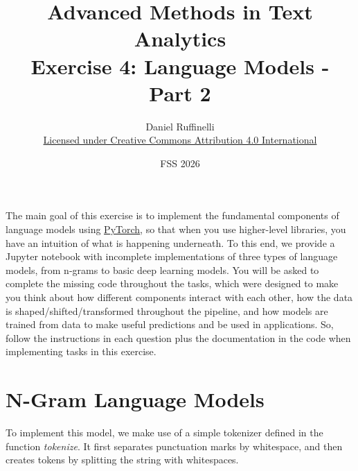\documentclass[11pt,a4paper]{article}
\title{Advanced Methods in Text Analytics \\ 
Exercise 4: Language Models - Part 2}
\author{Daniel Ruffinelli \\ \href{https://creativecommons.org/licenses/by/4.0/}{Licensed under Creative Commons Attribution 4.0 International}}
\date{FSS 2026}
\begin{document}
\maketitle

The main goal of this exercise is to implement the fundamental components of
language models using \href{https://pytorch.org/}{\underline{PyTorch}}, so that
when you use higher-level libraries, you have an intuition of what is happening
underneath.
To this end, we provide a Jupyter notebook with incomplete implementations of
three types of language models, from n-grams to basic deep learning models.
You will be asked to complete the missing code throughout the tasks, which were
designed to make you think about how different components interact with each
other, how the data is shaped/shifted/transformed throughout the pipeline, and
how models are trained from data to make useful predictions and be used in
applications.
So, follow the instructions in each question plus the documentation in the code
when implementing tasks in this exercise.

\section{N-Gram Language Models}

To implement this model, we make use of a simple tokenizer defined in the
function \emph{tokenize}.
It first separates punctuation marks by whitespace, and then creates tokens by
splitting the string with whitespaces.
\end{document}
